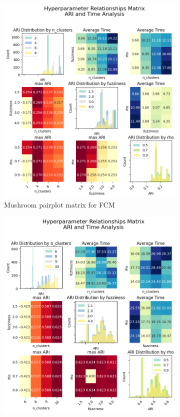 \begin{figure}[H]
\centering
\begin{subfigure}{0.49\textwidth}
\centering
\includegraphics[width=\linewidth]{figures/FuzzyCMeans/mushroom_hyperparameter_pairplot_matrix.png}
\caption{Mushroom pairplot matrix for FCM}
\end{subfigure}
\hfill
\begin{subfigure}{0.49\textwidth}
\centering
\includegraphics[width=\linewidth]{figures/FuzzyCMeans/penBased_hyperparameter_pairplot_matrix.png}

\end{subfigure}
\end{figure}
